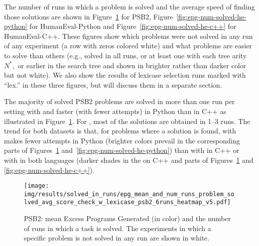 The number of runs in which a problem is solved and the average speed of finding those solutions are shown in Figure~\ref{fig:epg-num-solved-psb2} for PSB2, Figure~\ref{fig:epg-num-solved-he-python}
for HumanEval-Python and Figure~\ref{fig:epg-num-solved-he-c++} for HumanEval-C++.
These figures show which problems were not solved in any run of any experiment (a row with zeros colored white) and what problems are easier to solve than others (e.g., solved in all runs, or at least one with each tree arity $N^*,$ or earlier in the search tree and shown in brighter rather than darker color but not white). 
We also show the results of lexicase selection runs marked with ``lex.'' in these three figures, but will discuss them in a separate section. 

The majority of solved PSB2 problems are solved in more than one run per setting with \gpt{} and faster (with fewer attempts) in Python than in C++ as illustrated in Figure~\ref{fig:epg-num-solved-psb2}.
For \llama{}, most of the solutions are obtained in 1--3 runs.
The trend for both datasets is that, for problems where a solution is found, \method{} with \gpt{} makes fewer attempts in Python (brighter colors prevail in the corresponding parts of Figures~\ref{fig:epg-num-solved-psb2} and~\ref{fig:epg-num-solved-he-python}) than \method{} with \gpt{} in C++ or \method{} with \llama{} in both languages (darker shades in the \gpt{} on C++ and \llama{} parts of Figures~\ref{fig:epg-num-solved-psb2} and \ref{fig:epg-num-solved-he-c++}).


\begin{figure}[tb]
  \centering
  \texttt{[image: img/results/solved\_in\_runs/epg\_mean\_and\_num\_runs\_problem\_solved\_avg\_score\_check\_w\_lexicase\_psb2\_6runs\_heatmap\_v5.pdf]}
  \caption{PSB2: mean Excess Programs Generated (in color) and the number of runs in which a task is solved. The experiments in which a specific problem is not solved in any run are shown in white.}
  \label{fig:epg-num-solved-psb2}
\end{figure}

